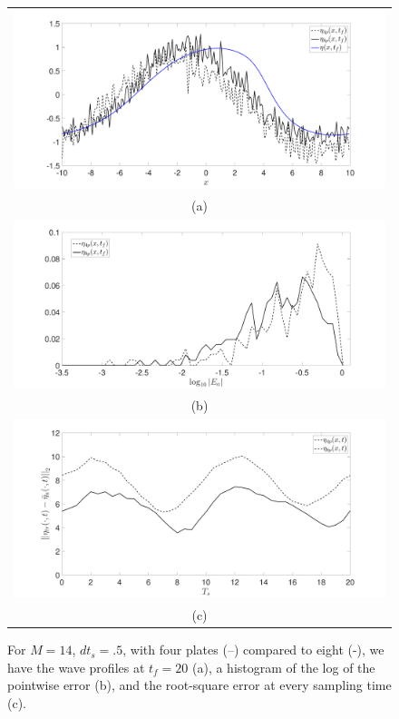 \begin{figure}
\centering
\begin{tabular}{c}
\includegraphics[width=.95\textwidth]{Images/wave_tf_20_sig_pt1_4_vs8pplates_Mval_14} \\
(a)\\
\includegraphics[width=.95\textwidth]{Images/histogram_tf_20_sig_pt1_4_vs8pplates_Mval_14}\\
(b)\\
\includegraphics[width=.95\textwidth]{Images/rmserr_tf_20_sig_pt1_4_vs8pplates_Mval_14}\\
(c)
\end{tabular}
\caption{For $M=14$, $dt_{s}=.5$, with four plates (--) compared to eight (-), we have the wave profiles at $t_{f}=20$ (a), a histogram of the log of the pointwise error (b), and the root-square error at every sampling time (c).} 
\label{fig:Mval_14}
\end{figure}


